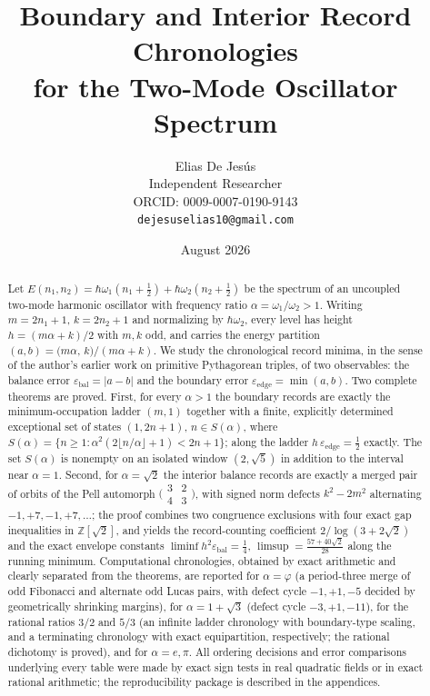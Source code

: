 \documentclass[11pt]{article}
\title{Boundary and Interior Record Chronologies\\ for the Two-Mode Oscillator Spectrum}
\author{Elias De Jes\'us\\ \small Independent Researcher\\ \small ORCID: 0009-0007-0190-9143\\ \small \texttt{dejesuselias10@gmail.com}}
\date{August 2026}
\theoremstyle{definition}
\theoremstyle{remark}
\newcommand{\eb}{\varepsilon_{\mathrm{bal}}}
\newcommand{\ee}{\varepsilon_{\mathrm{edge}}}
\newcommand{\ZZ}{\mathbb{Z}}
\begin{document}
\maketitle

\begin{abstract}
Let $E(n_1,n_2)=\hbar\omega_1(n_1+\tfrac12)+\hbar\omega_2(n_2+\tfrac12)$ be the spectrum of an uncoupled two-mode harmonic oscillator with frequency ratio $\alpha=\omega_1/\omega_2>1$. Writing $m=2n_1+1$, $k=2n_2+1$ and normalizing by $\hbar\omega_2$, every level has height $h=(m\alpha+k)/2$ with $m,k$ odd, and carries the energy partition $(a,b)=\bigl(m\alpha,\,k\bigr)/(m\alpha+k)$. We study the chronological record minima, in the sense of the author's earlier work on primitive Pythagorean triples, of two observables: the balance error $\eb=|a-b|$ and the boundary error $\ee=\min(a,b)$. Two complete theorems are proved. First, for every $\alpha>1$ the boundary records are exactly the minimum-occupation ladder $(m,1)$ together with a finite, explicitly determined exceptional set of states $(1,2n+1)$, $n\in S(\alpha)$, where $S(\alpha)=\{n\ge1:\alpha^2(2\lfloor n/\alpha\rfloor+1)<2n+1\}$; along the ladder $h\,\ee=\tfrac12$ exactly. The set $S(\alpha)$ is nonempty on an isolated window $(2,\sqrt5)$ in addition to the interval near $\alpha=1$. Second, for $\alpha=\sqrt2$ the interior balance records are exactly a merged pair of orbits of the Pell automorph $\bigl(\begin{smallmatrix}3&2\\4&3\end{smallmatrix}\bigr)$, with signed norm defects $k^2-2m^2$ alternating $-1,+7,-1,+7,\dots$; the proof combines two congruence exclusions with four exact gap inequalities in $\ZZ[\sqrt2]$, and yields the record-counting coefficient $2/\log(3+2\sqrt2)$ and the exact envelope constants $\liminf h^2\eb=\tfrac14$, $\limsup=\frac{57+40\sqrt2}{28}$ along the running minimum. Computational chronologies, obtained by exact arithmetic and clearly separated from the theorems, are reported for $\alpha=\varphi$ (a period-three merge of odd Fibonacci and alternate odd Lucas pairs, with defect cycle $-1,+1,-5$ decided by geometrically shrinking margins), for $\alpha=1+\sqrt3$ (defect cycle $-3,+1,-11$), for the rational ratios $3/2$ and $5/3$ (an infinite ladder chronology with boundary-type scaling, and a terminating chronology with exact equipartition, respectively; the rational dichotomy is proved), and for $\alpha=e,\pi$. All ordering decisions and error comparisons underlying every table were made by exact sign tests in real quadratic fields or in exact rational arithmetic; the reproducibility package is described in the appendices.
\end{abstract}
\end{document}

